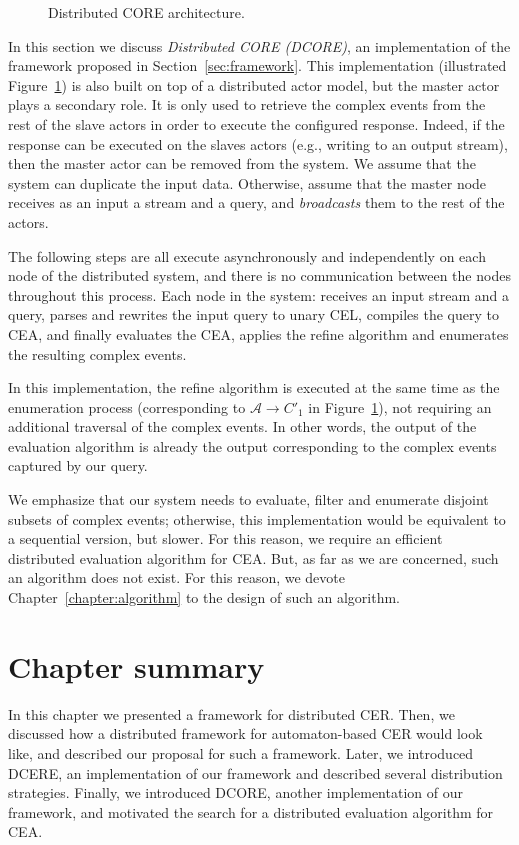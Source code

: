 \begin{figure}[t]
  \centering
  \caption{Distributed CORE architecture.}
  \label{fig:dcore}
\end{figure}

In this section we discuss \emph{Distributed CORE (DCORE)}, an implementation of the framework proposed in Section~\ref{sec:framework}. This implementation (illustrated Figure~\ref{fig:dcore}) is also built on top of a distributed actor model, but the master actor plays a secondary role. It is only used to retrieve the complex events from the rest of the slave actors in order to execute the configured response. Indeed, if the response can be executed on the slaves actors (e.g., writing to an output stream), then the master actor can be removed from the system. We assume that the system can duplicate the input data. Otherwise, assume that the master node receives as an input a stream and a query, and \emph{broadcasts} them to the rest of the actors.

The following steps are all execute asynchronously and independently on each node of the distributed system, and there is no communication between the nodes throughout this process. Each node in the system: receives an input stream and a query, parses and rewrites the input query to unary CEL, compiles the query to CEA, and finally evaluates the CEA, applies the refine algorithm and enumerates the resulting complex events.

In this implementation, the refine algorithm is executed at the same time as the enumeration process (corresponding to $\mathcal{A} \to C'_{1}$ in Figure~\ref{fig:dcore}), not requiring an additional traversal of the complex events. In other words, the output of the evaluation algorithm is already the output corresponding to the complex events captured by our query.

We emphasize that our system needs to evaluate, filter and enumerate disjoint subsets of complex events; otherwise, this implementation would be equivalent to a sequential version, but slower. For this reason, we require an efficient distributed evaluation algorithm for CEA. But, as far as we are concerned, such an algorithm does not exist. For this reason, we devote Chapter~\ref{chapter:algorithm} to the design of such an algorithm.

\section{Chapter summary}

In this chapter we presented a framework for distributed CER. Then, we discussed how a distributed framework for automaton-based CER would look like, and described our proposal for such a framework. Later, we introduced DCERE, an implementation of our framework and described several distribution strategies. Finally, we introduced DCORE, another implementation of our framework, and motivated the search for a distributed evaluation algorithm for CEA.
